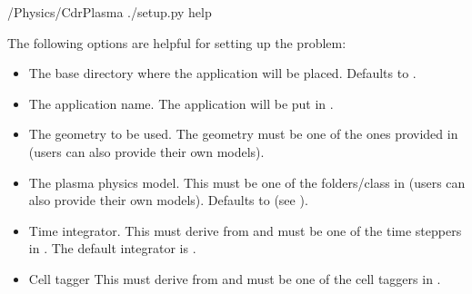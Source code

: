 \documentclass[letterpaper,10pt,english]{sphinxmanual}
\begin{document}
\begin{sphinxVerbatim}[commandchars=\\\{\},formatcom=\scriptsize]
 /Physics/CdrPlasma
./setup.py \PYGZhy{}\PYGZhy{}help
\end{sphinxVerbatim}

\sphinxAtStartPar
The following options are helpful for setting up the problem:
\begin{itemize}
\item {} 
\sphinxAtStartPar
{} The base directory where the application will be placed.
Defaults to .

\item {} 
\sphinxAtStartPar
{} The application name.
The application will be put in .

\item {} 
\sphinxAtStartPar
{} The geometry to be used.
The geometry must be one of the ones provided in  (users can also provide their own models).

\item {} 
\sphinxAtStartPar
{} The plasma physics model.
This must be one of the folders/class in  (users can also provide their own models).
Defaults to  (see {\hyperref[\detokenize{Applications/CdrPlasmaModel:chap-cdrplasmajson}]{}}).

\item {} 
\sphinxAtStartPar
{} Time integrator.
This must derive from  and must be one of the time steppers in .
The default integrator is .

\item {} 
\sphinxAtStartPar
{} Cell tagger
This must derive from  and must be one of the cell taggers in .

\end{itemize}
\end{document}
